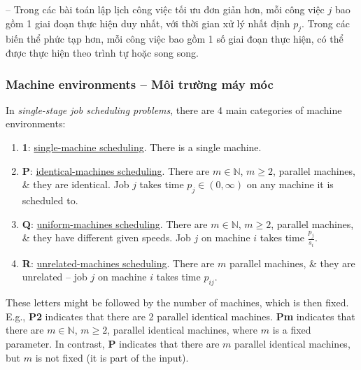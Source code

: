 \documentclass{article}
\begin{document}
-- Trong các bài toán lập lịch công việc tối ưu đơn giản hơn, mỗi công việc $j$ bao gồm 1 giai đoạn thực hiện duy nhất, với thời gian xử lý nhất định $p_j$. Trong các biến thể phức tạp hơn, mỗi công việc bao gồm 1 số giai đoạn thực hiện, có thể được thực hiện theo trình tự hoặc song song.


\subsubsection{Machine environments -- Môi trường máy móc}
In {\it single-stage job scheduling problems}, there are 4 main categories of machine environments:
\begin{enumerate}
	\item {\bf1}: \href{https://en.wikipedia.org/wiki/Single-machine_scheduling}{single-machine scheduling}. There is a single machine.
	\item {\bf P}: \href{https://en.wikipedia.org/wiki/Identical-machines_scheduling}{identical-machines scheduling}. There are $m\in\mathbb{N}$, $m\ge2$, parallel machines, \& they are identical. Job $j$ takes time $p_j\in(0,\infty)$ on any machine it is scheduled to.
	\item {\bf Q}: \href{https://en.wikipedia.org/wiki/Uniform-machines_scheduling}{uniform-machines scheduling}. There are $m\in\mathbb{N}$, $m\ge2$, parallel machines, \& they have different given speeds. Job $j$ on machine $i$ takes time $\frac{p_j}{s_i}$.
	\item {\bf R}: \href{https://en.wikipedia.org/wiki/Unrelated-machines_scheduling}{unrelated-machines scheduling}. There are $m$ parallel machines, \& they are unrelated -- job $j$ on machine $i$ takes time $p_{ij}$.
\end{enumerate}
These letters might be followed by the number of machines, which is then fixed. E.g., {\bf P2} indicates that there are 2 parallel identical machines. {\bf Pm} indicates that there are $m\in\mathbb{N}$, $m\ge2$, parallel identical machines, where $m$ is a fixed parameter. In contrast, {\bf P} indicates that there are $m$ parallel identical machines, but $m$ is not fixed (it is part of the input).
\end{document}
